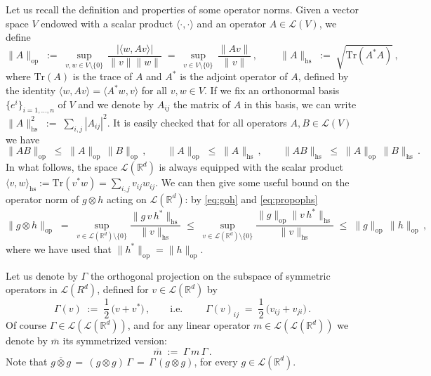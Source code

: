 \documentclass[a4paper,reqno,11pt]{amsart}
\numberwithin{equation}{section}
\newcommand{\cL}{{\ensuremath{\mathcal L}} }
\newcommand{\R}{\mathbb{R}}
\begin{document}
Let us recall the definition and properties
of some operator norms. Given a vector space $V$ endowed with
a scalar product $\langle \cdot, \cdot \rangle$ and an operator
$A \in \cL(V)$, we define
\begin{equation} \label{eq:ophs}
	\| A \|_{\text{op}} \;:=\; \sup_{v,w \in V \setminus \{0\}} \,
	\frac{|\langle w, A v \rangle|}{\|v\| \|w\|} \;=\;
	\sup_{v \in V \setminus \{0\}} \, \frac{\| Av \|}{\| v \|}\,, \qquad \
	\| A \|_{\text{hs}} \;:=\; \sqrt{\text{Tr}(A^* A)}\,,
\end{equation}
where $\text{Tr}(A)$ is the trace of $A$ and $A^*$ is the adjoint operator
of $A$, defined by the identity $\langle w, A v \rangle = \langle A^* w, v \rangle$
for all $v,w \in V$. If we fix an orthonormal basis $\{e^i\}_{i=1, \ldots, n}$
of $V$ and we denote by $A_{ij}$ the matrix of $A$ in this basis, we can write
$\| A \|_{\text{hs}}^2 \;:=\; \sum_{i,j} |A_{ij}|^2$.
It is easily checked that for all operators $A, B \in \cL(V)$ we have
\begin{equation} \label{eq:propophs}
	\|AB \|_{\text{op}} \;\le\; \|A\|_{\text{op}}\, \|B\|_{\text{op}}\,,
	\qquad
	\| A \|_{\text{op}} \;\le\; \|A\|_{\text{hs}} \,, \qquad
	\| A B \|_{\text{hs}} \;\le\;
	\|A\|_{\text{op}} \, \|B\|_{\text{hs}} \,.
\end{equation}
In what follows, the space $\cL(\R^d)$ is always equipped with the scalar product
$\langle v, w \rangle_{\text{hs}} := \text{Tr}(v^* w) = \sum_{i,j} v_{ij} w_{ij}$.
We can then give some useful bound on the operator norm of $g \otimes h$
acting on $\cL(\R^d)$: by \eqref{eq:goh} and \eqref{eq:propophs}
\begin{equation}
\label{eq:opineq}
\|g \otimes h\|_{\text{op}} \;=\;
\sup_{v \in \cL(\R^d) \setminus \{0\}}
\frac{\| g\, v\, h^* \|_{\text{hs}}}{\|v\|_{\text{hs}}}
\;\le\; \sup_{v \in \cL(\R^d) \setminus \{0\}}
\frac{\| g \|_{\text{op}} \|v\, h^* \|_{\text{hs}}}{\|v\|_{\text{hs}}}
\;\le\; \|g\|_{\text{op}} \, \|h\|_{\text{op}} \,,
\end{equation}
where we have used that $\|h^*\|_{\text{op}} = \|h\|_{\text{op}}$.

Let us denote by $\Gamma$ the orthogonal projection
on the subspace of symmetric operators in $\cL(R^d)$, defined
for $v \in \cL(\R^d)$ by
\begin{equation} \label{eq:symm0}
	\Gamma(v) \;:=\; \frac 12 \,\big( v + v^*)\,, \qquad
	\text{i.e. } \qquad \Gamma(v)_{ij} \;=\; \frac 12 \,
	\big( v_{ij} + v_{ji} \big) \,.
\end{equation}
Of course $\Gamma \in \cL(\cL(\R^d))$, and for
any linear operator $m \in \cL(\cL(\R^d))$ we denote by $\overline m$
its symmetrized version:
\begin{equation} \label{eq:symm1}
	\overline m \;:=\; \Gamma \, m \, \Gamma \,.
\end{equation}
Note that $\overline{g \otimes g}
\,=\, (g \otimes g)\, \Gamma \,=\, \Gamma \,(g \otimes g)$,
for every $g \in \cL(\R^d)$.
\end{document}
